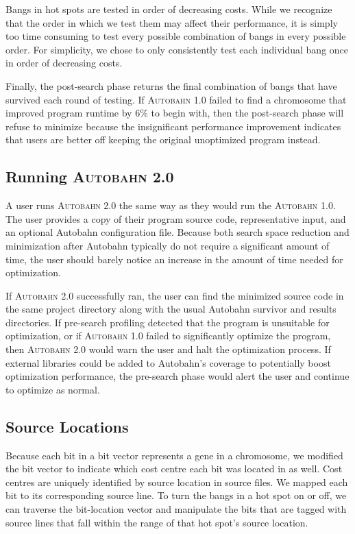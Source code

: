 \documentclass[format=sigplan, review=true]{acmart}
\newcommand{\hotspot}[0]{hot spot}
\newcommand{\hotspots}[0]{hot spots}
\newcommand{\Ao}[0]{\textsc{Autobahn 1.0}}
\newcommand{\At}[0]{\textsc{Autobahn 2.0}}
\newcommand{\preopt}[0]{pre-search}
\newcommand{\postopt}[0]{post-search}
\begin{document}
Bangs in \hotspots{} are tested in order of decreasing costs. While we recognize that the order in which we test them may affect their performance, it is simply too time consuming to test every possible combination of bangs in every possible order. For simplicity, we chose to only consistently test each individual bang once in order of decreasing costs. 

Finally, the \postopt{} phase returns the final combination of bangs that have survived each round of testing. If \Ao{} failed to find a chromosome that improved program runtime by 6\% to begin with, then the \postopt{} phase will refuse to minimize because the insignificant performance improvement indicates that users are better off keeping the original unoptimized program instead.


\subsection{Running \At{}}

A user runs \At{} the same way as they would run the \Ao{}. The user provides a copy of their program source code, representative input, and an optional Autobahn configuration file. Because both search space reduction and minimization after Autobahn typically do not require a significant amount of time, the user should barely notice an increase in the amount of time needed for optimization. 

If \At{} successfully ran, the user can find the minimized source code in the same project directory along with the usual Autobahn survivor and results directories. If \preopt{} profiling detected that the program is unsuitable for optimization, or if \Ao{} failed to significantly optimize the program, then \At{} would warn the user and halt the optimization process. If external libraries could be added to Autobahn's coverage to potentially boost optimization performance, the \preopt{} phase would alert the user and continue to optimize as normal.

\subsection{Source Locations}

Because each bit in a bit vector represents a gene in a chromosome, we modified the bit vector to indicate which cost centre each bit was located in as well. 
Cost centres are uniquely identified by source location in source files. We mapped each bit to its corresponding source line. To turn the bangs in a \hotspot{} on or off, we can traverse the bit-location vector and manipulate the bits that are tagged with source lines that fall within the range of that \hotspot{}'s source location.
\end{document}
